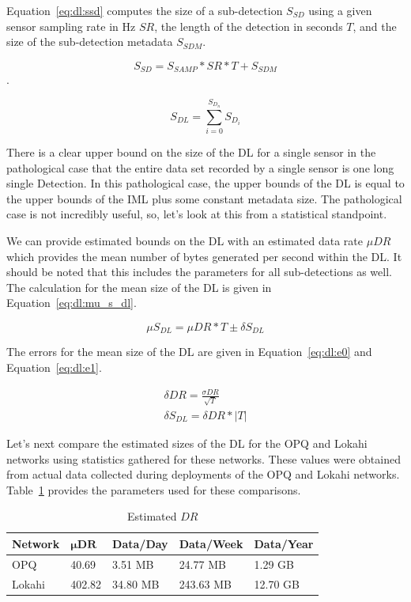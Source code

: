 Equation~\ref{eq:dl:ssd} computes the size of a sub-detection $S_{SD}$ using a given sensor sampling rate in Hz $SR$, the length of the detection in seconds $T$, and the size of the sub-detection metadata $S_{SDM}$.

\begin{equation}\label{eq:dl:ssd}
	S_{SD} = S_{SAMP} * SR * T + S_{SDM}
\end{equation}.

\begin{equation}\label{eq:dl:dl}
	S_{DL} = \sum_{i=0}^{S_{D_{n}}} S_{D_{i}}
\end{equation}

There is a clear upper bound on the size of the DL for a single sensor in the pathological case that the entire data set recorded by a single sensor is one long single Detection. In this pathological case, the upper bounds of the DL is equal to the upper bounds of the IML plus some constant metadata size. The pathological case is not incredibly useful, so, let's look at this from a statistical standpoint.

We can provide estimated bounds on the DL with an estimated data rate $\mu DR$ which provides the mean number of bytes generated per second within the DL\@. It should be noted that this includes the parameters for all sub-detections as well. The calculation for the mean size of the DL is given in Equation~\ref{eq:dl:mu_s_dl}.

\begin{equation}\label{eq:dl:mu_s_dl}
	\mu S_{DL} = \mu DR * T \pm \delta S_{DL}
\end{equation}

The errors for the mean size of the DL are given in Equation~\ref{eq:dl:e0} and Equation~\ref{eq:dl:e1}.

\begin{align}
	\delta DR = \frac{\sigma DR}{\sqrt{T}} \label{eq:dl:e0} \\
	\delta S_{DL} = \delta {DR} * |T| \label{eq:dl:e1}
\end{align}

Let's next compare the estimated sizes of the DL for the OPQ and Lokahi networks using statistics gathered for these networks. These values were obtained from actual data collected during deployments of the OPQ and Lokahi networks. Table~\ref{table:estimated_mu_dr} provides the parameters used for these comparisons.

\begin{table}[H]
	\centering
	\caption{Estimated $DR$}
	\begin{tabularx}{\textwidth}{lllll}
		\toprule
		\textbf{Network} & $\bm{\mu DR}$ & \textbf{Data/Day} & \textbf{Data/Week} & \textbf{Data/Year} \\
		\midrule
		OPQ & 40.69 & 3.51 MB & 24.77 MB & 1.29 GB \\
		Lokahi & 402.82 & 34.80 MB & 243.63 MB & 12.70 GB \\
		\bottomrule
	\end{tabularx}
	\label{table:estimated_mu_dr}
\end{table}

